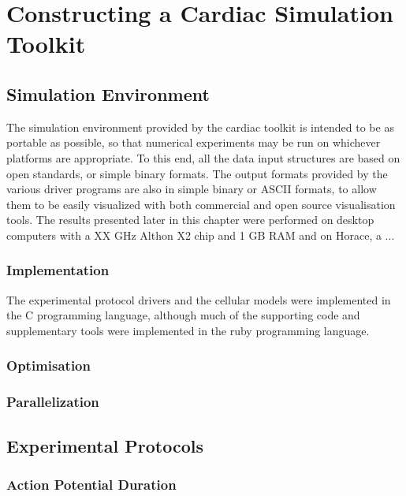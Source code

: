 \chapter{Constructing a Cardiac Simulation Toolkit}

\section{Simulation Environment}

The simulation environment provided by the cardiac toolkit is intended to be as
portable as possible, so that numerical experiments may be run on whichever
platforms are appropriate.  To this end, all the data input structures are based
on open standards, or simple binary formats.  The output formats provided by the
various driver programs are also in simple binary or ASCII formats, to allow
them to be easily visualized with both commercial and open source visualisation
tools.  The results presented later in this chapter were performed on desktop
computers with a XX GHz Althon X2 chip and 1 GB RAM and on Horace, a ...

\subsection{Implementation}

The experimental protocol drivers and the cellular models were implemented in
the C programming language, although much of the supporting code and
supplementary tools were implemented in the ruby programming language.

\subsection{Optimisation}

\subsection{Parallelization}



\section{Experimental Protocols}



\subsection{Action Potential Duration}

